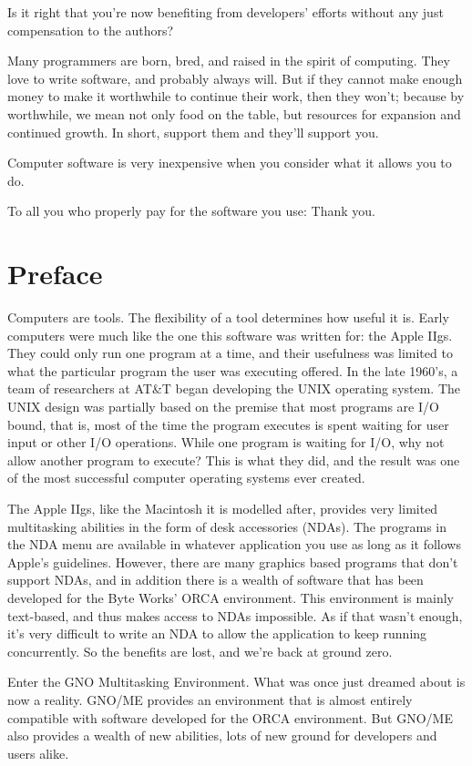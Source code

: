 Is it right that you're now benefiting from
developers' efforts without any just compensation to the authors?

Many programmers are born, bred, and raised in the spirit of
computing. They love to write software, and probably always
will. But if they cannot make enough money to make it
worthwhile to continue their work, then they won't; because by
worthwhile, we mean not only food on the table, but resources for
expansion and continued growth. In short,
support them and they'll support you.
 
Computer software is very inexpensive when you
consider what it allows you to do.
 
To all you who properly pay for the software you use:
Thank you.

\chapter{Preface}

Computers are tools. The flexibility of a
tool determines how useful it is. Early computers were much like
the one this software was written for: the Apple IIgs. They could
only run one program at a time, and their usefulness was limited
to what the particular program the user was executing offered. In
the late 1960's, a team of researchers at AT\&T began
developing the UNIX operating system. The UNIX design was
partially based on the premise that most programs are I/O bound,
that is, most of the time the program executes is spent waiting
for user input or other I/O operations. While one program is
waiting for I/O, why not allow another program to execute? This
is what they did, and the result was one of the most successful
computer operating systems ever created.

The Apple IIgs, like the Macintosh it is
modelled after, provides very limited multitasking abilities in
the form of desk accessories (NDAs). The programs in the NDA menu
are available in whatever application you use as long as it
follows Apple's guidelines. However, there are many graphics
based programs that don't support NDAs, and in addition there is
a wealth of software that has been developed for the Byte Works'
ORCA environment. This environment is mainly text-based, and thus
makes access to NDAs impossible. As if that wasn't enough, it's
very difficult to write an NDA to allow the application to keep
running concurrently. So the benefits are lost, and we're back at
ground zero.

Enter the GNO Multitasking Environment.
What was once just dreamed about is now a reality. GNO/ME
provides an environment that is almost entirely compatible with
software developed for the ORCA environment. But GNO/ME also
provides a wealth of new abilities, lots of new ground for
developers and users alike.

